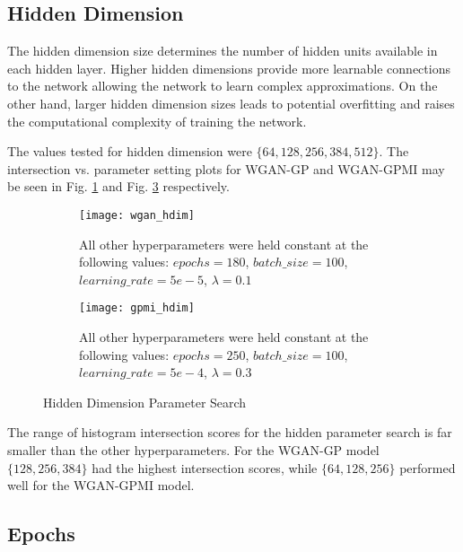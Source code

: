\subsection{Hidden Dimension}
\label{sec:hdim}

The hidden dimension size determines the number of hidden units available in each hidden layer. Higher hidden dimensions provide more learnable connections to the network allowing the network to learn complex approximations. On the other hand, larger hidden dimension sizes leads to potential overfitting and raises the computational complexity of training the network.

The values tested for hidden dimension were $\{64, 128, 256, 384, 512\}$. The intersection vs. parameter setting plots for WGAN-GP and WGAN-GPMI may be seen in Fig. \ref{fig:wgan_hdim} and Fig. \ref{fig:gpmi_hdim} respectively.

\begin{figure}[!htbp]
	\centering
	\begin{subfigure}{.7\textwidth}
		\texttt{[image: wgan\_hdim]}
	\end{subfigure}%
	\begin{subfigure}{.3\textwidth}
		\caption{
			All other hyperparameters were held constant at the following values: $epochs=180$, $batch\_size = 100$, $learning\_rate=5e-5$, $\lambda=0.1$
		}
		\label{fig:wgan_hdim}
	\end{subfigure}%

	\begin{subfigure}{.7\textwidth}
		\texttt{[image: gpmi\_hdim]}
	\end{subfigure}%
	\begin{subfigure}{.3\textwidth}
		\caption{
			All other hyperparameters were held constant at the following values: $epochs=250$, $batch\_size=100$, $learning\_rate=5e-4$, $\lambda=0.3$
		}
		\label{fig:gpmi_hdim}
	\end{subfigure}%
	\caption{Hidden Dimension Parameter Search}
\end{figure}


The range of histogram intersection scores for the hidden parameter search is far smaller than the other hyperparameters. For the WGAN-GP model $\{128, 256, 384\}$ had the highest intersection scores, while $\{64,128,256\}$ performed well for the WGAN-GPMI model.


\subsection{Epochs}
\label{sec:epoch}

